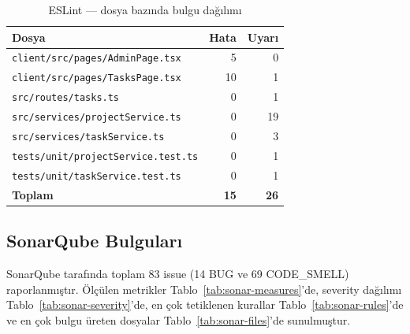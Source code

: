 \documentclass[conference]{IEEEtran}
\begin{document}
\begin{table}[htbp]
\caption{ESLint — dosya bazında bulgu dağılımı}
\label{tab:eslint-files}
\centering
\begin{tabular}{@{}lrr@{}}
\toprule
\textbf{Dosya} & \textbf{Hata} & \textbf{Uyarı} \\
\midrule
\texttt{client/src/pages/AdminPage.tsx}        &  5 &  0 \\
\texttt{client/src/pages/TasksPage.tsx}        & 10 &  1 \\
\texttt{src/routes/tasks.ts}                   &  0 &  1 \\
\texttt{src/services/projectService.ts}        &  0 & 19 \\
\texttt{src/services/taskService.ts}           &  0 &  3 \\
\texttt{tests/unit/projectService.test.ts}     &  0 &  1 \\
\texttt{tests/unit/taskService.test.ts}        &  0 &  1 \\
\midrule
\textbf{Toplam} & \textbf{15} & \textbf{26} \\
\bottomrule
\end{tabular}
\end{table}

\subsection{SonarQube Bulguları}

SonarQube tarafında toplam 83 issue (14 BUG ve 69 CODE\_SMELL)
raporlanmıştır. Ölçülen metrikler Tablo~\ref{tab:sonar-measures}'de,
severity dağılımı Tablo~\ref{tab:sonar-severity}'de, en çok tetiklenen
kurallar Tablo~\ref{tab:sonar-rules}'de ve en çok bulgu üreten dosyalar
Tablo~\ref{tab:sonar-files}'de sunulmuştur.
\end{document}
